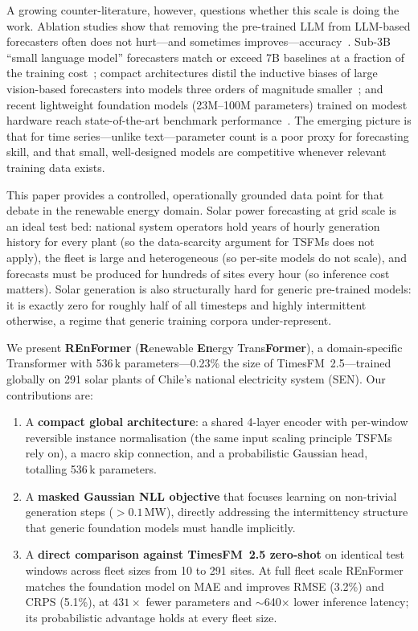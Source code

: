 \documentclass[10pt,twocolumn]{article}
\begin{document}
A growing counter-literature, however, questions whether this scale is
doing the work. Ablation studies show that removing the pre-trained LLM
from LLM-based forecasters often does not hurt---and sometimes
improves---accuracy~\cite{tan2024useful}. Sub-3B ``small language
model'' forecasters match or exceed 7B baselines at a fraction of the
training cost~\cite{fan2025smetimes}; compact architectures distil the
inductive biases of large vision-based forecasters into models three
orders of magnitude smaller~\cite{shen2025svtime}; and recent
lightweight foundation models (23M--100M parameters) trained on modest
hardware reach state-of-the-art benchmark
performance~\cite{birkel2025tinytsm,he2025sempo}. The emerging picture
is that for time series---unlike text---parameter count is a poor proxy
for forecasting skill, and that small, well-designed models are
competitive whenever relevant training data exists.

This paper provides a controlled, operationally grounded data point for
that debate in the renewable energy domain. Solar power forecasting at
grid scale is an ideal test bed: national system operators hold years of
hourly generation history for every plant (so the data-scarcity argument
for TSFMs does not apply), the fleet is large and heterogeneous (so
per-site models do not scale), and forecasts must be produced for
hundreds of sites every hour (so inference cost matters). Solar
generation is also structurally hard for generic pre-trained models: it
is exactly zero for roughly half of all timesteps and highly
intermittent otherwise, a regime that generic training corpora
under-represent.

We present \textbf{REnFormer} (\textbf{R}enewable \textbf{En}ergy
Trans\textbf{Former}), a domain-specific Transformer with 536\,k
parameters---0.23\% the size of TimesFM~2.5---trained globally on 291
solar plants of Chile's national electricity system (SEN). Our
contributions are:
\begin{enumerate}
  \item A \textbf{compact global architecture}: a shared 4-layer encoder
    with per-window reversible instance normalisation (the same input
    scaling principle TSFMs rely on), a macro skip connection, and a
    probabilistic Gaussian head, totalling 536\,k parameters.
  \item A \textbf{masked Gaussian NLL objective} that focuses learning
    on non-trivial generation steps ($>0.1$\,MW), directly addressing
    the intermittency structure that generic foundation models must
    handle implicitly.
  \item A \textbf{direct comparison against TimesFM~2.5
    zero-shot} on identical test windows across fleet sizes from 10 to
    291 sites. At full fleet scale REnFormer matches the foundation
    model on MAE and improves RMSE (3.2\%) and CRPS (5.1\%), at
    $431\times$ fewer parameters and $\sim$640$\times$ lower inference
    latency; its probabilistic advantage holds at every fleet size.
\end{enumerate}
\end{document}
